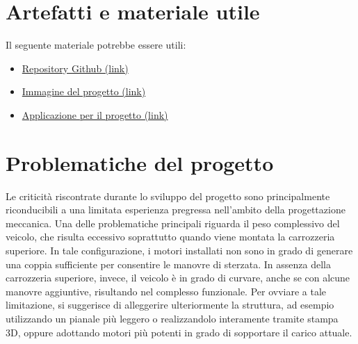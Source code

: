 \documentclass{article}
\begin{document}
\section{Artefatti e materiale utile}
Il seguente materiale potrebbe essere utili:
\begin{itemize}
    \item \href{https://github.com/romanellas24/ProjectMacchinino}{Repository Github (link)}
    \item \href{https://drive.google.com/file/d/1MoiCT64zxduojVPOSujiyetljlcGCyqI/view?usp=sharing}{Immagine del progetto (link)}
    \item \href{https://drive.google.com/file/d/1pBQub-4NPCsr4k8kCNmbKAS30iKXMzs3/view?usp=sharing}{Applicazione per il progetto (link)}
\end{itemize}
\section{Problematiche del progetto}
Le criticità riscontrate durante lo sviluppo del progetto sono principalmente riconducibili a una limitata esperienza pregressa nell’ambito della progettazione meccanica.
\newline
Una delle problematiche principali riguarda il peso complessivo del veicolo, che risulta eccessivo soprattutto quando viene montata la carrozzeria superiore. In tale configurazione, i motori installati non sono in grado di generare una coppia sufficiente per consentire le manovre di sterzata.
\newline
In assenza della carrozzeria superiore, invece, il veicolo è in grado di curvare, anche se con alcune manovre aggiuntive, risultando nel complesso funzionale.
\newline
Per ovviare a tale limitazione, si suggerisce di alleggerire ulteriormente la struttura, ad esempio utilizzando un pianale più leggero o realizzandolo interamente tramite stampa 3D, oppure adottando motori più potenti in grado di sopportare il carico attuale.
\end{document}
